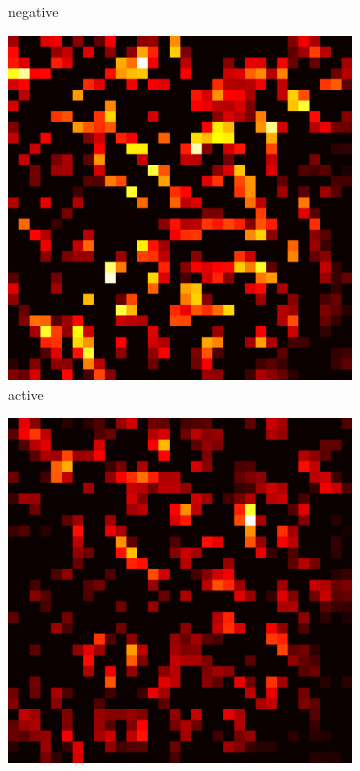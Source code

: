 \documentclass[preprint,12pt]{elsarticle}
\begin{document}
\begin{figure}
\begin{subfigure}{0.14\textwidth}
        \caption{negative}
    \end{subfigure}
    \hfill
    \begin{subfigure}{0.14\textwidth}
        \centering
        \includegraphics[width=\linewidth]{../visualizations/examples/cifar10/resnet18/active_saliency_map/5.png}
        \caption{active}
    \end{subfigure}
    \hfill
    \begin{subfigure}{0.14\textwidth}
        \centering
        \includegraphics[width=\linewidth]{../visualizations/examples/cifar10/resnet18/inactive_saliency_map/5.png}

\end{subfigure}
\end{figure}
\end{document}
